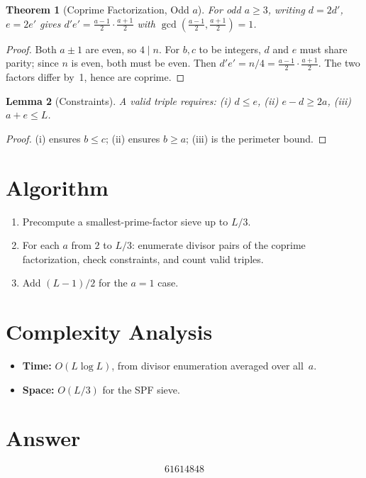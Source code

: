 \documentclass[12pt]{article}
\newtheorem{theorem}{Theorem}
\newtheorem{lemma}[theorem]{Lemma}
\begin{document}
\begin{theorem}[Coprime Factorization, Odd $a$]
For odd $a \geq 3$, writing $d = 2d'$, $e = 2e'$ gives $d'e' = \frac{a-1}{2} \cdot \frac{a+1}{2}$ with $\gcd\!\left(\frac{a-1}{2}, \frac{a+1}{2}\right) = 1$.
\end{theorem}
\begin{proof}
Both $a \pm 1$ are even, so $4 \mid n$. For $b, c$ to be integers, $d$ and $e$ must share parity; since $n$ is even, both must be even. Then $d'e' = n/4 = \frac{a-1}{2} \cdot \frac{a+1}{2}$. The two factors differ by~1, hence are coprime.
\end{proof}

\begin{lemma}[Constraints]
A valid triple requires: (i) $d \leq e$, (ii) $e - d \geq 2a$, (iii) $a + e \leq L$.
\end{lemma}
\begin{proof}
(i) ensures $b \leq c$; (ii) ensures $b \geq a$; (iii) is the perimeter bound.
\end{proof}

\section{Algorithm}
\begin{enumerate}
\item Precompute a smallest-prime-factor sieve up to $L/3$.
\item For each $a$ from $2$ to $L/3$: enumerate divisor pairs of the coprime factorization, check constraints, and count valid triples.
\item Add $(L-1)/2$ for the $a = 1$ case.
\end{enumerate}

\section{Complexity Analysis}
\begin{itemize}
\item \textbf{Time:} $O(L \log L)$, from divisor enumeration averaged over all~$a$.
\item \textbf{Space:} $O(L/3)$ for the SPF sieve.
\end{itemize}

\section{Answer}

\[
\boxed{61614848}
\]
\end{document}
